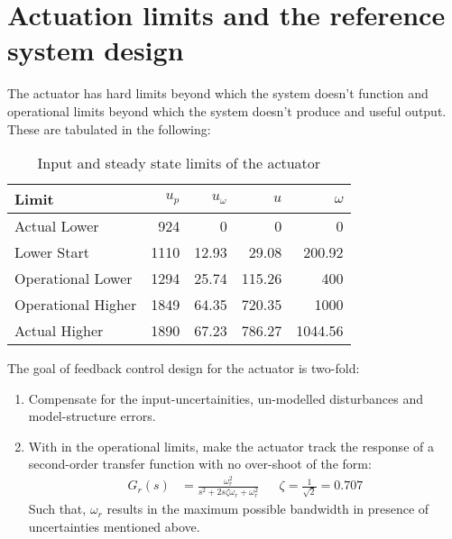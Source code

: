 \section{Actuation limits and the reference system design}
The actuator has hard limits beyond which the system doesn't function and
operational limits beyond which the system doesn't produce and useful output.
These are tabulated in the following:
\begin{table}[H]
    \centering
    \begin{tabular}{l r r r r}
        \hline \hline
        Limit & $u_p$ & $u_{\omega}$ & $u$ & $\omega$ \\ \hline \hline
        Actual Lower         & 924  & 0     & 0        & 0\\
        Lower Start          & 1110 & 12.93 & 29.08    & 200.92 \\
        Operational Lower    & 1294 & 25.74 & 115.26   & 400 \\
        Operational Higher   & 1849 & 64.35 & 720.35   & 1000\\
        Actual Higher        & 1890 & 67.23 & 786.27   &  1044.56\\
        \hline \hline
    \end{tabular}
    \caption{Input and steady state limits of the actuator}
\end{table}



The goal of feedback control design for the actuator is two-fold:
\begin{enumerate}
\item Compensate for the input-uncertainities, un-modelled disturbances and
model-structure errors.
\item With in the operational limits, make the actuator track the response of a second-order transfer function
with no over-shoot of the form:
\begin{align*}
    G_{r}(s) &= \frac{\omega_{r}^2}{s^2 + 2s \zeta \omega_{r} + \omega_{r}^2}
    && \zeta = \frac{1}{\sqrt{2}} = 0.707
\end{align*}
Such that, $\omega_{r}$ results in the maximum possible bandwidth in presence
of uncertainties mentioned above.
\end{enumerate}

